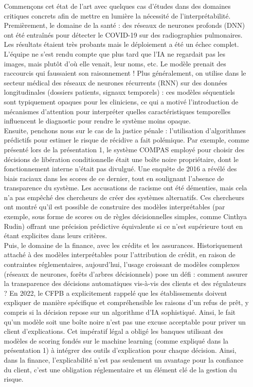 \documentclass{article}
\begin{document}
\quad Commençons cet état de l’art avec quelques cas d'études dans des domaines critiques concrets afin de mettre en lumière la nécessité de l'interprétabilité.\\

Premièrement, le domaine de la santé : des réseaux de neurones profonds (DNN) ont été entraînés pour détecter le COVID-19 sur des radiographies pulmonaires. Les résultats étaient très probants mais le déploiement a été un échec complet. L'équipe ne s'est rendu compte que plus tard que l’IA ne regardait pas les images, mais plutôt d'où elle venait, leur noms, etc. Le modèle prenait des raccourcis qui faussaient son raisonnement ! Plus généralement, on utilise dans le secteur médical des réseaux de neurones récurrents (RNN) sur des données longitudinales (dossiers patients, signaux temporels) : ces modèles séquentiels sont typiquement opaques pour les cliniciens, ce qui a motivé l’introduction de mécanismes d’attention pour interpréter quelles caractéristiques temporelles influencent le diagnostic pour rendre le système moins opaque.\\

Ensuite, penchons nous sur le cas de la justice pénale : l’utilisation d’algorithmes prédictifs pour estimer le risque de récidive a fait polémique. Par exemple, comme présenté lors de la présentation 1, le système COMPAS employé pour choisir des décisions de libération conditionnelle était une boîte noire propriétaire, dont le fonctionnement interne n’était pas divulgué. Une enquête de 2016 a révélé des biais raciaux dans les scores de ce dernier, tout en soulignant l’absence de transparence du système. Les accusations de racisme ont été démenties, mais cela n’a pas empêché des chercheurs de créer des systèmes alternatifs. Ces chercheurs ont montré qu’il est possible de construire des modèles interprétables (par exemple, sous forme de scores ou de règles décisionnelles simples, comme Cinthya Rudin) offrant une précision prédictive équivalente si ce n’est supérieure tout en étant explicites dans leurs critères.\\

Puis, le domaine de la finance, avec les crédits et les assurances. Historiquement attaché à des modèles interprétables pour l’attribution de crédit, en raison de contraintes réglementaires, aujourd’hui, l’usage croissant de modèles complexes (réseaux de neurones, forêts d’arbres décisionnels) pose un défi : comment assurer la transparence des décisions automatiques vis-à-vis des clients et des régulateurs ? En 2022, le CFPB a explicitement rappelé que les établissements doivent expliquer de manière spécifique et compréhensible les raisons d’un refus de prêt, y compris si la décision repose sur un algorithme d’IA sophistiqué. Ainsi, le fait qu’un modèle soit une boîte noire n’est pas une excuse acceptable pour priver un client d’explications. Cet impératif légal a obligé les banques utilisant des modèles de scoring fondés sur le machine learning (comme expliqué dans la présentation 1) à intégrer des outils d’explication pour chaque décision. Ainsi, dans la finance, l’explicabilité n’est pas seulement un avantage pour la confiance du client, c’est une obligation réglementaire et un élément clé de la gestion du risque.\\
\end{document}
